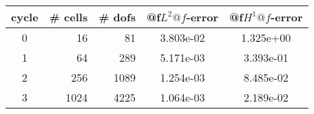 \documentclass[10pt]{report}
\begin{document}
\begin{table}[H]
\begin{center}
\begin{tabular}{|c|r|r|c|c|} \hline
cycle & \# cells & \# dofs & @f$L^2@f$-error & @f$H^1@f$-error\\ \hline
0 & 16 & 81 & 3.803e-02 & 1.325e+00\\ \hline
1 & 64 & 289 & 5.171e-03 & 3.393e-01\\ \hline
2 & 256 & 1089 & 1.254e-03 & 8.485e-02\\ \hline
3 & 1024 & 4225 & 1.064e-03 & 2.189e-02\\ \hline
\end{tabular}
\end{center}
\end{table}
\end{document}
